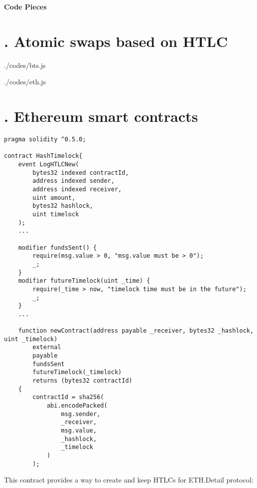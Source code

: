 \begin{huge}
\textbf{Code Pieces}
\end{huge}



\section{\uppercase\expandafter{}. Atomic swaps based on HTLC}

\begin{lstinputlisting}[language=JavaScript,  
						caption=Bitshares deploy the HTLC, 	
						firstline = 36, 
						lastline = 94,
						escapechar=@]{./codes/bts.js}
\end{lstinputlisting}


\begin{lstinputlisting}[language=JavaScript, 
						caption=Ethereum refund after expiration, 
						firstline=198,
						lastline=260]{./codes/eth.js}	
\end{lstinputlisting}

\section{\uppercase\expandafter{}. Ethereum smart contracts}
\label{sec:contract}


\begin{lstlisting}[language=Solidity, 
						caption = Create hash timelock contract example]
pragma solidity ^0.5.0;

contract HashTimelock{
    event LogHTLCNew(
        bytes32 indexed contractId,
        address indexed sender,
        address indexed receiver,
        uint amount,
        bytes32 hashlock,
        uint timelock
    );
	...
	
	modifier fundsSent() {
        require(msg.value > 0, "msg.value must be > 0");
        _;
    }
    modifier futureTimelock(uint _time) {
        require(_time > now, "timelock time must be in the future");
        _;
    }
    ...
    
    function newContract(address payable _receiver, bytes32 _hashlock, uint _timelock)
        external
        payable
        fundsSent
        futureTimelock(_timelock)
        returns (bytes32 contractId)
    {
        contractId = sha256(
            abi.encodePacked(
                msg.sender,
                _receiver,
                msg.value,
                _hashlock,
                _timelock
            )
        );

\end{lstlisting}
\noindent This contract provides a way to create and keep
HTLCs for ETH.\footnotemark[1] Detail protocol:

